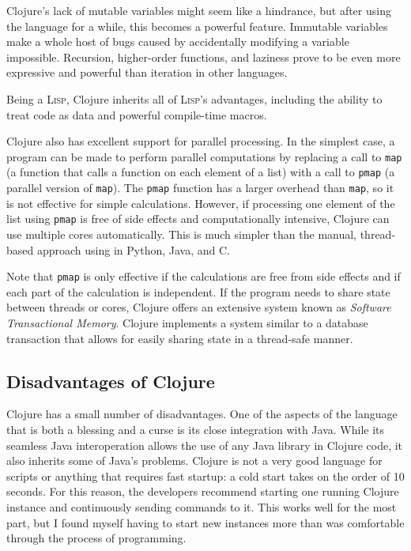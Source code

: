 \documentclass{article}
\begin{document}
Clojure's lack of mutable variables might seem like a hindrance, but after
using the language for a while, this becomes a powerful feature.  Immutable
variables make a whole host of bugs caused by accidentally modifying a variable
impossible.  Recursion, higher-order functions, and laziness prove to be even
more expressive and powerful than iteration in other languages.

Being a \textsc{Lisp}, Clojure inherits all of \textsc{Lisp}'s advantages,
including the ability to treat code as data and powerful compile-time macros.

Clojure also has excellent support for parallel processing.  In the simplest
case, a program can be made to perform parallel computations by replacing a call
to \texttt{map} (a function that calls a function on each element of a list)
with a call to \texttt{pmap} (a parallel version of \texttt{map}).  The
\texttt{pmap} function has a larger overhead than \texttt{map}, so it is not
effective for simple calculations.  However, if processing one element of the
list using \texttt{pmap} is free of side effects and computationally intensive,
Clojure can use multiple cores automatically.  This is much simpler than the
manual, thread-based approach using in Python, Java, and C.

Note that \texttt{pmap} is only effective if the calculations are free from side
effects and if each part of the calculation is independent.  If the program
needs to share state between threads or cores, Clojure offers an extensive system
known as \emph{Software Transactional Memory}.  Clojure implements a system similar to
a database transaction that allows for easily sharing state in a thread-safe
manner.  

\subsection{Disadvantages of Clojure}

Clojure has a small number of disadvantages.  One of the aspects of the language
that is both a blessing and a curse is its close integration with Java.  While
its seamless Java interoperation allows the use of any Java library in Clojure
code, it also inherits some of Java's problems.  Clojure is not a very good
language for scripts or anything that requires fast startup: a cold start takes
on the order of 10 seconds.  For this reason, the developers recommend starting
one running Clojure instance and continuously sending commands to it.  This
works well for the most part, but I found myself having to start new instances
more than was comfortable through the process of programming.
\end{document}
